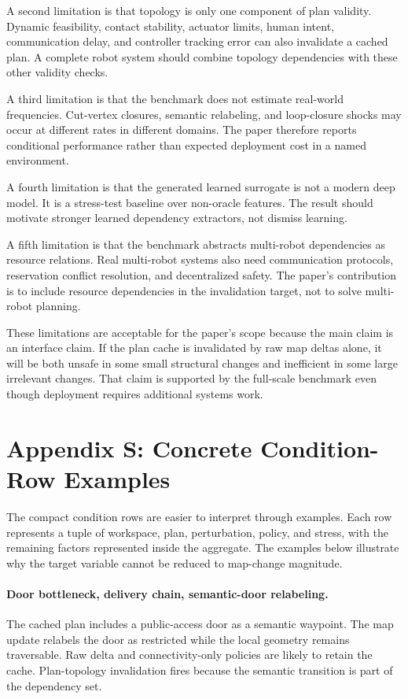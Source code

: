 \documentclass{article}
\begin{document}
A second limitation is that topology is only one component of plan validity. Dynamic feasibility, contact stability, actuator limits, human intent, communication delay, and controller tracking error can also invalidate a cached plan. A complete robot system should combine topology dependencies with these other validity checks.

A third limitation is that the benchmark does not estimate real-world frequencies. Cut-vertex closures, semantic relabeling, and loop-closure shocks may occur at different rates in different domains. The paper therefore reports conditional performance rather than expected deployment cost in a named environment.

A fourth limitation is that the generated learned surrogate is not a modern deep model. It is a stress-test baseline over non-oracle features. The result should motivate stronger learned dependency extractors, not dismiss learning.

A fifth limitation is that the benchmark abstracts multi-robot dependencies as resource relations. Real multi-robot systems also need communication protocols, reservation conflict resolution, and decentralized safety. The paper's contribution is to include resource dependencies in the invalidation target, not to solve multi-robot planning.

These limitations are acceptable for the paper's scope because the main claim is an interface claim. If the plan cache is invalidated by raw map deltas alone, it will be both unsafe in some small structural changes and inefficient in some large irrelevant changes. That claim is supported by the full-scale benchmark even though deployment requires additional systems work.

\section{Appendix S: Concrete Condition-Row Examples}

The compact condition rows are easier to interpret through examples. Each row represents a tuple of workspace, plan, perturbation, policy, and stress, with the remaining factors represented inside the aggregate. The examples below illustrate why the target variable cannot be reduced to map-change magnitude.

\paragraph{Door bottleneck, delivery chain, semantic-door relabeling.}
The cached plan includes a public-access door as a semantic waypoint. The map update relabels the door as restricted while the local geometry remains traversable. Raw delta and connectivity-only policies are likely to retain the cache. Plan-topology invalidation fires because the semantic transition is part of the dependency set.
\end{document}
